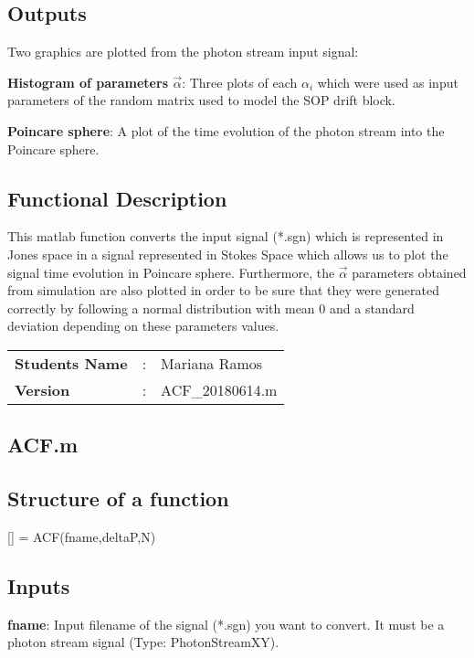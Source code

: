 \subsection*{Outputs}
Two graphics are plotted from the photon stream input signal:
\bigskip

\textbf{Histogram of parameters $\vec{\alpha}$}: Three plots of each $\alpha_i$ which were used as input parameters of the random matrix used to model the SOP drift block.
\bigskip

\textbf{Poincare sphere}: A plot of the time evolution of the photon stream into the Poincare sphere.



\subsection*{Functional Description}

This matlab function converts the input signal (*.sgn) which is represented in Jones space in a signal represented in Stokes Space which allows us to plot the signal time evolution in Poincare sphere. Furthermore, the $\vec{\alpha}$ parameters obtained from simulation are also plotted in order to be sure that they were generated correctly by following a normal distribution with mean $0$ and a standard deviation depending on these parameters values.

\begin{tcolorbox}	
	\begin{tabular}{p{2.75cm} p{0.2cm} p{10.5cm}} 	
		\textbf{Students Name}  &:& Mariana Ramos\\
		\textbf{Version}        &:& ACF\_20180614.m 
	\end{tabular}
\end{tcolorbox}
\subsection{ACF.m}

\subsection*{Structure of a function}
[] = ACF(fname,deltaP,N)

\subsection*{Inputs}
\indent

\textbf{fname}: Input filename of the signal (*.sgn) you want to convert. It must be a photon stream signal (Type: PhotonStreamXY).
\bigskip

